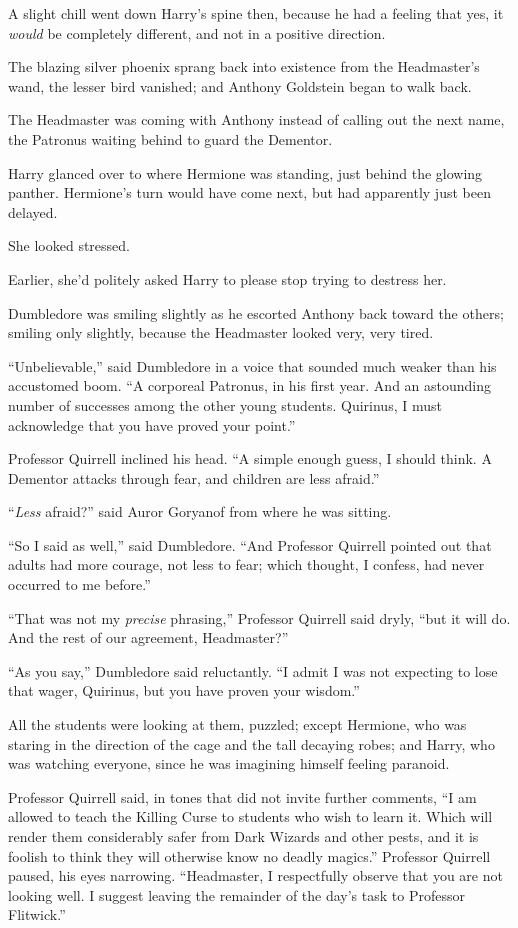 A slight chill went down Harry's spine then, because he had a feeling that yes, it \emph{would} be completely different, and not in a positive direction.

The blazing silver phoenix sprang back into existence from the Headmaster's wand, the lesser bird vanished; and Anthony Goldstein began to walk back.

The Headmaster was coming with Anthony instead of calling out the next name, the Patronus waiting behind to guard the Dementor.

Harry glanced over to where Hermione was standing, just behind the glowing panther. Hermione's turn would have come next, but had apparently just been delayed.

She looked stressed.

Earlier, she'd politely asked Harry to please stop trying to destress her.

Dumbledore was smiling slightly as he escorted Anthony back toward the others; smiling only slightly, because the Headmaster looked very, very tired.

``Unbelievable,'' said Dumbledore in a voice that sounded much weaker than his accustomed boom. ``A corporeal Patronus, in his first year. And an astounding number of successes among the other young students. Quirinus, I must acknowledge that you have proved your point.''

Professor Quirrell inclined his head. ``A simple enough guess, I should think. A Dementor attacks through fear, and children are less afraid.''

``\emph{Less} afraid?'' said Auror Goryanof from where he was sitting.

``So I said as well,'' said Dumbledore. ``And Professor Quirrell pointed out that adults had more courage, not less to fear; which thought, I confess, had never occurred to me before.''

``That was not my \emph{precise} phrasing,'' Professor Quirrell said dryly, ``but it will do. And the rest of our agreement, Headmaster?''

``As you say,'' Dumbledore said reluctantly. ``I admit I was not expecting to lose that wager, Quirinus, but you have proven your wisdom.''

All the students were looking at them, puzzled; except Hermione, who was staring in the direction of the cage and the tall decaying robes; and Harry, who was watching everyone, since he was imagining himself feeling paranoid.

Professor Quirrell said, in tones that did not invite further comments, ``I am allowed to teach the Killing Curse to students who wish to learn it. Which will render them considerably safer from Dark Wizards and other pests, and it is foolish to think they will otherwise know no deadly magics.'' Professor Quirrell paused, his eyes narrowing. ``Headmaster, I respectfully observe that you are not looking well. I suggest leaving the remainder of the day's task to Professor Flitwick.''

